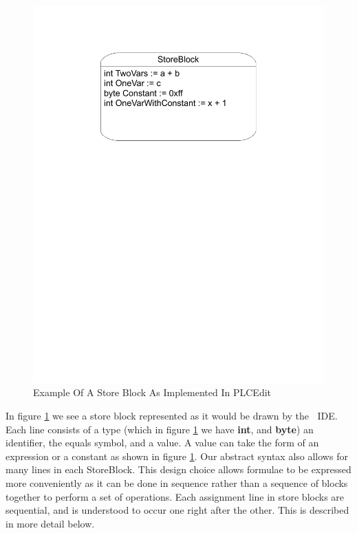 \begin{figure}[htp]
    \centering
    \includegraphics[trim= 20mm 175mm 20mm 10mm, clip, width=\imgmedium]{./images/state_storeblock.pdf}
    \caption{Example Of A Store Block As Implemented In PLCEdit}
    \label{fig:state_storeblock}
\end{figure}

In figure \ref{fig:state_storeblock} we see a store block represented as it would be drawn by the \plcchart $\:$ IDE. Each line consists of a type (which in figure \ref{fig:state_storeblock} we have \textbf{int}, and \textbf{byte}) an identifier, the equals symbol, and a value. A value can take the form of an expression or a constant as shown in figure \ref{fig:state_storeblock}. Our abstract syntax also allows for many lines in each StoreBlock. This design choice allows formulae to be expressed more conveniently as it can be done in sequence rather than a sequence of blocks together to perform a set of operations.
Each assignment line in store blocks are sequential, and is understood to occur one right after the other. This is described in more detail below.


